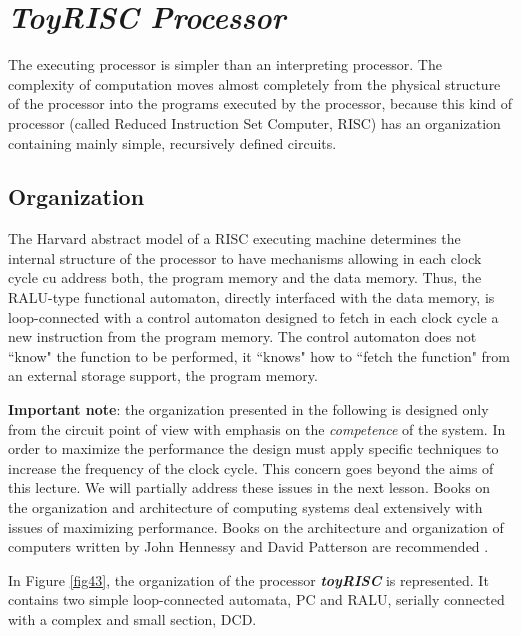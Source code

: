 \section{{\bf {\em ToyRISC Processor}}}

The executing processor is simpler than an interpreting processor.
The complexity of computation moves almost completely from the
physical structure of the processor into the programs executed by
the processor, because this kind of processor (called Reduced Instruction Set Computer, RISC)  has an organization
containing mainly simple, recursively defined circuits.


\subsection{Organization}

The Harvard abstract model of a RISC executing machine  determines the internal structure of the
processor to have mechanisms allowing in each clock cycle cu
address both, the program memory and the data memory. Thus, the
RALU-type functional automaton, directly interfaced with the data
memory, is loop-connected with a control automaton designed to
fetch in each clock cycle a new instruction from the program
memory. The control automaton does not ``know" the function to be
performed, it ``knows" how to ``fetch the function" from an external storage
support, the program memory.


{\bf Important note}: the organization presented in the following is designed only from the circuit point of view with emphasis on the {\em competence} of the system. In order to maximize the performance the design must apply specific techniques to increase the frequency of the clock cycle. This concern goes beyond the aims of this lecture. We will partially address these issues in the next lesson. Books on the organization and architecture of computing systems deal extensively with issues of maximizing performance. Books on the architecture and organization of computers written by John Hennessy and David Patterson are recommended  \citep{Hennessy19, Patterson19}.

In Figure \ref{fig43}, the organization of the processor {\bf {\em toyRISC}} is represented. It contains two simple loop-connected automata, PC and RALU, serially connected with a complex and small section, DCD.


